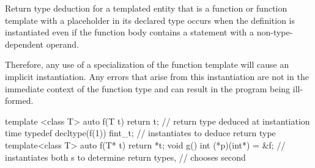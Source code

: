 \pnum
Return type deduction for a templated entity
that is a function or function template with a placeholder in its
declared type occurs when the definition is instantiated even if the function
body contains a  statement with a non-type-dependent operand.
\begin{note}
Therefore, any use of a specialization of the function template will
cause an implicit instantiation. Any errors that arise from this instantiation
are not in the immediate context of the function type and can result in the
program being ill-formed.
\end{note}
\begin{example}
\begin{codeblock}
template <class T> auto f(T t) { return t; }    // return type deduced at instantiation time
typedef decltype(f(1)) fint_t;                  // instantiates  to deduce return type
template<class T> auto f(T* t) { return *t; }
void g() { int (*p)(int*) = &f; }               // instantiates both s to determine return types,
                                                // chooses second
\end{codeblock}
\end{example}

